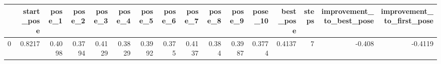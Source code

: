 \begin{tabular}{lrrrrrrrrrrrrrrr}
\toprule
{} &  start\_pose &  pose\_1 &  pose\_2 &  pose\_3 &  pose\_4 &  pose\_5 &  pose\_6 &  pose\_7 &  pose\_8 &  pose\_9 &  pose\_10 &  best\_pose &  steps &  improvement\_to\_best\_pose &  improvement\_to\_first\_pose \\
\midrule
0 &      0.8217 &  0.4098 &  0.3794 &  0.4129 &  0.3829 &  0.3992 &   0.375 &  0.4137 &   0.384 &  0.3987 &   0.3774 &     0.4137 &      7 &                    -0.408 &                    -0.4119 \\
\bottomrule
\end{tabular}
